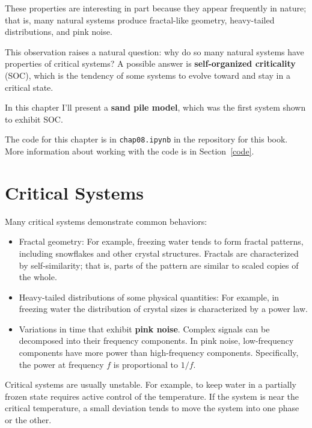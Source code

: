 \documentclass[12pt]{book}
\theoremstyle{exercise}
\begin{document}
These properties are interesting in part because they appear
frequently in nature; that is, many natural systems produce
fractal-like geometry, heavy-tailed distributions, and pink noise.

This observation raises a natural question: why do so many natural
systems have properties of critical systems?  A possible answer is
{\bf self-organized criticality} (SOC), which is the tendency of some
systems to evolve toward and stay in a critical state.

In this chapter I'll present a {\bf sand pile model}, which was the
first system shown to exhibit SOC.

The code for this chapter is in {\tt chap08.ipynb} in the repository
for this book.  More information about working with the code is
in Section~\ref{code}.


\section{Critical Systems}

Many critical systems demonstrate common behaviors:

\begin{itemize}

\item Fractal geometry: For example, freezing water tends to form
  fractal patterns, including snowflakes and other crystal
  structures.  Fractals are characterized by self-similarity; that is,
  parts of the pattern are similar to scaled copies of the whole.


\item Heavy-tailed distributions of some physical quantities: For
  example, in freezing water the distribution of crystal sizes is
  characterized by a power law.


\item Variations in time that exhibit {\bf pink noise}.  Complex
  signals can be decomposed into their frequency components.  In pink
  noise, low-frequency components have more power than high-frequency
  components.  Specifically, the power at frequency $f$ is
  proportional to $1/f$.


\end{itemize}

Critical systems are usually unstable.  For example, to keep water in
a partially frozen state requires active control of the temperature.
If the system is near the critical temperature, a small deviation
tends to move the system into one phase or the other.
\end{document}
